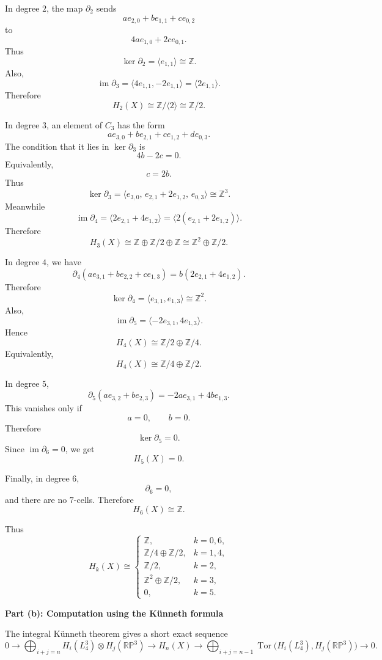 \begin{solution}
In degree \(2\), the map \(\partial_2\) sends
\[
a e_{2,0}+b e_{1,1}+c e_{0,2}
\]
to
\[
4a e_{1,0}+2c e_{0,1}.
\]
Thus
\[
\ker \partial_2=\langle e_{1,1}\rangle\cong \mathbb Z.
\]
Also,
\[
\operatorname{im}\partial_3
=
\langle 4e_{1,1},-2e_{1,1}\rangle
=
\langle 2e_{1,1}\rangle.
\]
Therefore
\[
H_2(X)
\cong
\mathbb Z/\langle 2\rangle
\cong
\mathbb Z/2.
\]

In degree \(3\), an element of \(C_3\) has the form
\[
a e_{3,0}+b e_{2,1}+c e_{1,2}+d e_{0,3}.
\]
The condition that it lies in \(\ker \partial_3\) is
\[
4b-2c=0.
\]
Equivalently,
\[
c=2b.
\]
Thus
\[
\ker \partial_3
=
\langle e_{3,0},\, e_{2,1}+2e_{1,2},\, e_{0,3}\rangle
\cong \mathbb Z^3.
\]
Meanwhile
\[
\operatorname{im}\partial_4
=
\langle 2e_{2,1}+4e_{1,2}\rangle
=
\langle 2(e_{2,1}+2e_{1,2})\rangle.
\]
Therefore
\[
H_3(X)
\cong
\mathbb Z\oplus \mathbb Z/2\oplus \mathbb Z
\cong
\mathbb Z^2\oplus \mathbb Z/2.
\]

In degree \(4\), we have
\[
\partial_4(ae_{3,1}+be_{2,2}+ce_{1,3})
=
b(2e_{2,1}+4e_{1,2}).
\]
Therefore
\[
\ker \partial_4
=
\langle e_{3,1},e_{1,3}\rangle
\cong \mathbb Z^2.
\]
Also,
\[
\operatorname{im}\partial_5
=
\langle -2e_{3,1},4e_{1,3}\rangle.
\]
Hence
\[
H_4(X)
\cong
\mathbb Z/2\oplus \mathbb Z/4.
\]
Equivalently,
\[
H_4(X)\cong \mathbb Z/4\oplus \mathbb Z/2.
\]

In degree \(5\),
\[
\partial_5(ae_{3,2}+be_{2,3})
=
-2a e_{3,1}+4b e_{1,3}.
\]
This vanishes only if
\[
a=0,
\qquad
b=0.
\]
Therefore
\[
\ker \partial_5=0.
\]
Since \(\operatorname{im}\partial_6=0\), we get
\[
H_5(X)=0.
\]

Finally, in degree \(6\),
\[
\partial_6=0,
\]
and there are no \(7\)-cells. Therefore
\[
H_6(X)\cong \mathbb Z.
\]

Thus
\[
\boxed{
	H_k(X)\cong
	\begin{cases}
		\mathbb Z, & k=0,6,\\[1mm]
		\mathbb Z/4\oplus \mathbb Z/2, & k=1,4,\\[1mm]
		\mathbb Z/2, & k=2,\\[1mm]
		\mathbb Z^2\oplus \mathbb Z/2, & k=3,\\[1mm]
		0, & k=5.
\end{cases}}
\]


\medskip
\noindent\textbf{Part (b): Computation using the Künneth formula}\par
\smallskip


The integral Künneth theorem gives a short exact sequence
\[
0
\longrightarrow
\bigoplus_{i+j=n}
H_i(L_4^3)\otimes H_j(\mathbb{RP}^3)
\longrightarrow
H_n(X)
\longrightarrow
\bigoplus_{i+j=n-1}
\operatorname{Tor}\bigl(H_i(L_4^3),H_j(\mathbb{RP}^3)\bigr)
\longrightarrow
0.
\]


\end{solution}
